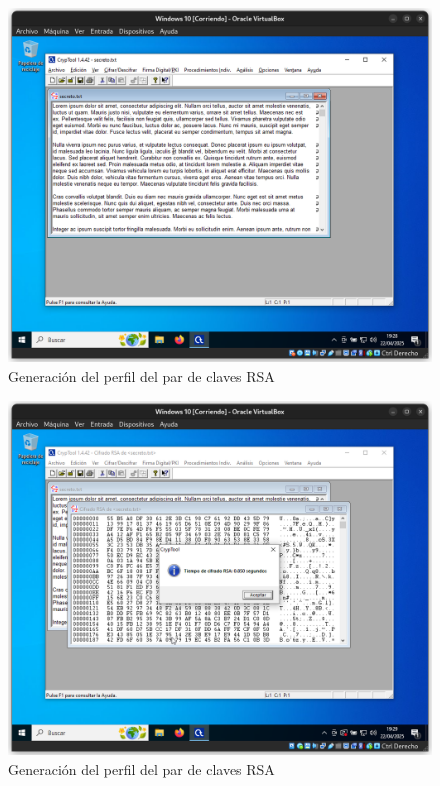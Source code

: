 \begin{figure}[H]
    \includegraphics[width=\textwidth]{EncriptadoRSA-1}
    \caption{Generación del perfil del par de claves RSA}
\end{figure}

\begin{figure}[H]
    \includegraphics[width=\textwidth]{EncriptadoRSA-2}
    \caption{Generación del perfil del par de claves RSA}
\end{figure}

